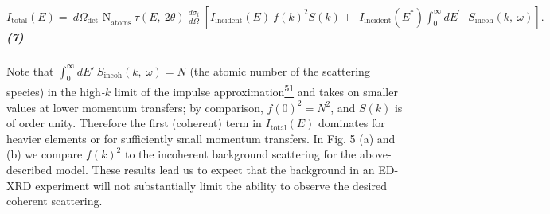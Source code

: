\subparagraph{\texorpdfstring{\(I_{\text{total}}\left( E \right) = \ {d\Omega_{\det}\text{\ N}}_{\text{atoms}}\ \tau\left( E,\ 2\theta \right)\ \frac{d\sigma_{t}}{d\Omega}\ \left\lbrack I_{\text{incident}}\left( E \right)\ {f\left( k \right)}^{2}S\left( k \right) + \ \ I_{\text{incident}}\left( E^{*} \right)\int_{0}^{\infty}{dE^{'}}\text{\ \ }S_{\text{incoh}}\left( k,\ \omega \right) \right\rbrack.\mathbf{\ }\)(7)}{I\_\{\textbackslash{}text\{total\}\}\textbackslash{}left( E \textbackslash{}right) = \textbackslash{} \{d\textbackslash{}Omega\_\{\textbackslash{}det\}\textbackslash{}text\{\textbackslash{} N\}\}\_\{\textbackslash{}text\{atoms\}\}\textbackslash{} \textbackslash{}tau\textbackslash{}left( E,\textbackslash{} 2\textbackslash{}theta \textbackslash{}right)\textbackslash{} \textbackslash{}frac\{d\textbackslash{}sigma\_\{t\}\}\{d\textbackslash{}Omega\}\textbackslash{} \textbackslash{}left\textbackslash{}lbrack I\_\{\textbackslash{}text\{incident\}\}\textbackslash{}left( E \textbackslash{}right)\textbackslash{} \{f\textbackslash{}left( k \textbackslash{}right)\}\^{}\{2\}S\textbackslash{}left( k \textbackslash{}right) + \textbackslash{} \textbackslash{} I\_\{\textbackslash{}text\{incident\}\}\textbackslash{}left( E\^{}\{*\} \textbackslash{}right)\textbackslash{}int\_\{0\}\^{}\{\textbackslash{}infty\}\{dE\^{}\{'\}\}\textbackslash{}text\{\textbackslash{} \textbackslash{} \}S\_\{\textbackslash{}text\{incoh\}\}\textbackslash{}left( k,\textbackslash{} \textbackslash{}omega \textbackslash{}right) \textbackslash{}right\textbackslash{}rbrack.\textbackslash{}mathbf\{\textbackslash{} \}(7)}}\label{iux5ftexttotalleft-e-right-domegaux5fdettext-nux5ftextatoms-tauleft-e-2theta-right-fracdsigmaux5ftdomega-leftlbrack-iux5ftextincidentleft-e-right-fleft-k-right2sleft-k-right-iux5ftextincidentleft-e-rightintux5f0inftydetext-sux5ftextincohleft-k-omega-right-rightrbrack.mathbf-7}

Note that
\(\int_{0}^{\infty}{dE'}\ S_{\text{incoh}}\left( k,\ \omega \right) = N\)
(the atomic number of the scattering species) in the high\emph{-}\(k\)
limit of the impulse
approximation\hyperref[p.-eisenberger-and-p.-m.-platzman-physical-review-a-2-415-1970.]{\textsuperscript{51}}
and takes on smaller values at lower momentum transfers; by comparison,
\({f(0)}^{2} = N^{2}\), and \(S(k)\) is of order unity. Therefore the
first (coherent) term in \(I_{\text{total}}\left( E \right)\) dominates
for heavier elements or for sufficiently small momentum transfers. In
Fig. 5 (a) and (b) we compare \({f(k)}^{2}\) to the incoherent
background scattering for the above-described model. These results lead
us to expect that the background in an ED-XRD experiment will not
substantially limit the ability to observe the desired coherent
scattering.

